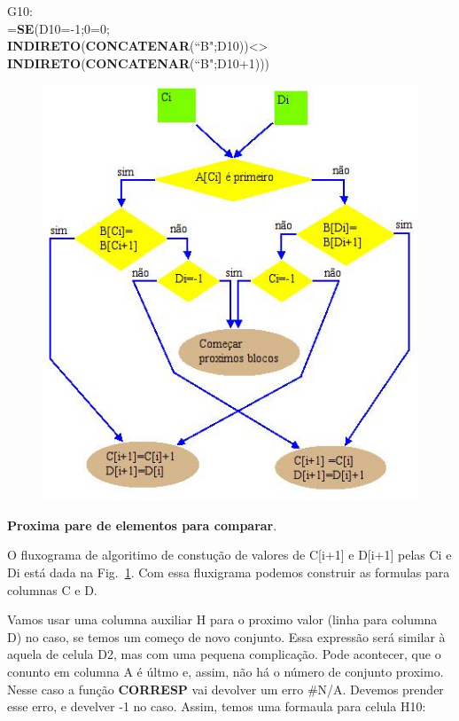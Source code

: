 \documentclass[12pt]{article}
\begin{document}
\noindent
G10:\\
=\textbf{SE}(D10=-1;0=0;\\
\textbf{INDIRETO}(\textbf{CONCATENAR}(``B";D10))\textless\textgreater\\
\textbf{INDIRETO}(\textbf{CONCATENAR}(``B";D10+1)))


\begin{figure}[htb]
\begin{center}
\includegraphics{./imgs/pic4}
\end{center}
\caption{}\label{pic4}
\end{figure}

\textbf{Proxima pare de elementos para comparar}.

O fluxograma de algoritimo de constu\c{c}\~ao de valores de C[i+1]
e D[i+1] pelas Ci e Di est\'a dada na Fig.~\ref{pic4}. Com essa
fluxigrama podemos construir as formulas para columnas C e D.

Vamos usar uma columna auxiliar H para o proximo valor (linha para
columna D) no caso, se temos um come\c{c}o de novo conjunto. Essa
express\~ao ser\'a similar \`a aquela de celula D2, mas com uma
pequena complica\c{c}\~ao. Pode acontecer, que o conunto em
columna A \'e \'ultmo e, assim, n\~ao h\'a o n\'umero de conjunto
proximo. Nesse caso a fun\c{c}\~ao \textbf{CORRESP} vai devolver
um erro \#N/A. Devemos prender esse erro, e develver -1 no caso.
Assim, temos uma formaula para celula H10:
\end{document}

